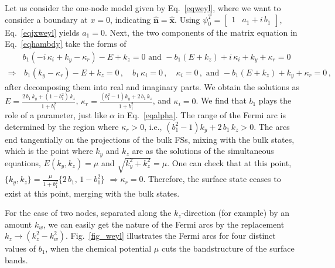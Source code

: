 \documentclass[aps,prb,onecolumn, footinbib, 10pt]{revtex4-2}
\def \nn{\nonumber \\}
\begin{document}
Let us consider the one-node model given by Eq.~\eqref{eqweyl}, where we want to consider a boundary at $x=0$, indicating $\boldsymbol{\hat n} = \boldsymbol{\hat x} $. Using $ \psi_0^T  = \begin{bmatrix}
1 & a_1 +i \, b_1 \end{bmatrix}$, Eq.~\eqref{eqjxweyl} yields $ a_1  =  0 $. Next, the two components of the matrix equation in Eq.~\eqref{eqhambdy} take the forms of
\begin{align}
& b_1 \left(-i \,\kappa_i+k_y-\kappa_r\right)- E +k_z   = 0 
\text{ and }
-b_1 \left( E + k_z\right)+i \,\kappa_i+k_y+\kappa_r = 0 \nn
\Rightarrow & \, b_1 \left(k_y-\kappa_r\right)- E +k_z = 0\,, \quad 
b_1 \,\kappa_i = 0 \,, \quad \kappa_i = 0 \,, \text{ and }
-b_1 \left(E +k_z\right)+k_y+\kappa_r = 0\,,
\end{align}
after decomposing them into real and imaginary parts.
We obtain the solutions as $E = \frac{2 \,b_1\, k_y +(1- b_1^2)\, k_z} { 1 + b_1^2 }$, $\kappa_r 
= \frac{\left(b_1^2-1\right) k_y+2 \,b_1\, k_z} { 1 + b_1^2 } $, and $\kappa_i = 0$. We find that $b_1$ plays the role of a parameter, just like $\alpha$ in Eq.~\eqref{eqalpha}. The range of the Fermi arc is determined by the region where $\kappa_r > 0 $, i.e., $ \left(b_1^2-1\right) k_y+2 \,b_1\, k_z > 0$.  The arcs end tangentially on the projections of the bulk FSs, mixing with the bulk states, which is the point where $k_y$ and $k_z$ are as the solutions of the simultaneous equations, $E (k_y, k_z) =\mu$ and $\sqrt{k_y^2 + k_z^2} = \mu$. One can check that at this point, $\lbrace 
k_y, k_z \rbrace = \frac{\mu } { 1+b_1^2 } \lbrace 2\, b_1 , \, 1- b_1^2 \rbrace $ $\Rightarrow \kappa_r = 0 $. Therefore, the surface state ceases to exist at this point, merging with the bulk states.  

For the case of two nodes, separated along the $ k_z$-direction (for example) by an amount $k_w$, we can easily get the nature of the Fermi arcs by the replacement $ k_z \rightarrow (k_z^2 - k_w^2)$. Fig.~\ref{fig_weyl} illustrates the Fermi arcs for four distinct values of $b_1$, when the chemical potential $\mu$ cuts the bandstructure of the surface bands.
\end{document}
